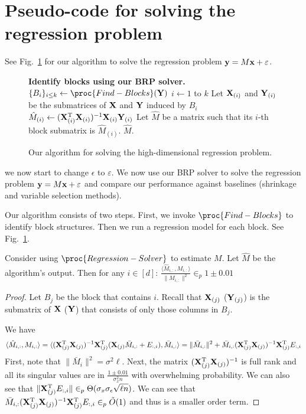 \section{Pseudo-code for solving the regression problem}
See Fig.~\ref{fig:regression_algo} for our algorithm to solve the regression problem $\mathbf{y} = M \mathbf{x} + \varepsilon$. 

\begin{figure}
    \centering
{\small
    \begin{codebox}
\li \Comment \textbf{Identify blocks using our BRP solver.} 
\li $\{B_i\}_{i \leq k} \gets \proc{Find-Blocks}(\mY)$
\li \For $i \gets 1$ to $k$
\li \Do Let $\mathbf{X}_{(i)}$ and $\mathbf{Y}_{(i)}$ be the submatrices of $\mathbf{X}$ and $\mathbf{Y}$ induced by $B_i$
\li $\hat M_{(i)}\gets (\mathbf{X}^{\mathrm{T}}_{(i)}\mathbf{X}_{(i)})^{-1}\mathbf{X}_{(i)}\mathbf{Y}_{(i)}$
\End
\li Let $\hat M$ be a matrix such that
its $i$-th block submatrix is $\hat M_{(i)}$. 
\li \Return $\hat M$. 
\end{codebox}
}
\caption{Our algorithm for solving the high-dimensional regression problem.}
    \label{fig:regression_algo}
\end{figure}


{\color{red} we now start to change $\epsilon$ to $\varepsilon$.}
We now use our BRP solver to solve the regression problem $\mathbf{y} = M \mathbf{x} + \varepsilon$ and compare our performance against baselines (shrinkage and variable selection methods).  

\iffalse
Our algorithm consists of two steps. First, we invoke $\proc{Find-Blocks}$ to identify block structures. Then we run a regression model for each block. See Fig.~\ref{fig:regression_algo}. 

\begin{lemma}\label{lem:regression} Consider using $\proc{Regression-Solver}$ to estimate $M$. Let $\hat M$ be the algorithm's output. Then for any $i \in [d]$:
$\frac{\langle \hat M_{i, :}, M_{i, :}\rangle}{\|M_{i, :}\|^2} \in_p 1\pm 0.01$
\end{lemma}

\begin{proof}Let $B_j$ be the block that contains $i$. Recall that $\mathbf{X}_{(j)}$ ($\mathbf{Y}_{(j)}$) is the submatrix of $\mathbf{X}$ ($\mathbf{Y}$) that consists of only those columns in $B_j$. 

We have 
\begin{equation}
    \langle \hat M_{i, :}, M_{i, :} \rangle = \langle (\mathbf{X}^{\mathrm{T}}_{(j)}\mathbf{X}_{(j)})^{-1}\mathbf{X}^{\mathrm{T}}_{(j)}(\mathbf{X}_{(j)} \bar M_{i, :} + E_{:, i}), \bar M_{i, :} \rangle = \|\bar M_{i, :}\|^2 + \bar M_{i, :}  (\mathbf{X}^{\mathrm{T}}_{(j)}\mathbf{X}_{(j)})^{-1}\mathbf{X}^{\mathrm{T}}_{(j)}E_{:, i}
\end{equation}
First, note that $\|\bar M_{i}\|^2 = \sigma^2 \ell$. Next, the matrix $(\mathbf{X}^{\mathrm{T}}_{(j)}\mathbf{X}_{(j)})^{-1}$ is full rank and all its singular values are in $\frac{1\pm 0.01}{\sigma^2_x n}$ with overwhelming probability. We can also see that $\|\mathbf{X}^{\mathrm{T}}_{(j)}E_{:, i}\| \in_p \Theta(\sigma_x \sigma_{\epsilon}\sqrt{\ell n})$. We can see that $\bar M_{i, :}  (\mathbf{X}^{\mathrm{T}}_{(j)}\mathbf{X}_{(j)})^{-1}\mathbf{X}^{\mathrm{T}}_{(j)}E_{:, i} \in_p \tilde O(1)$ and thus is a smaller order term. 
\end{proof}

